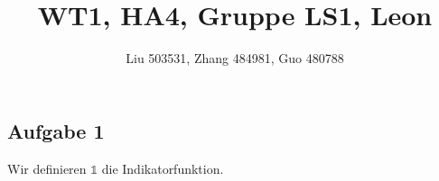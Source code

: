 \documentclass[fleqn,draft,a5paper]{article}
\title{WT1, HA4, Gruppe LS1, Leon}
\author{Liu 503531, Zhang 484981, Guo 480788}
\theoremstyle{remark}
\begin{document}
\maketitle

\subsection{Aufgabe 1}
Wir definieren $\mathbb{1}$ die Indikatorfunktion.
\end{document}
